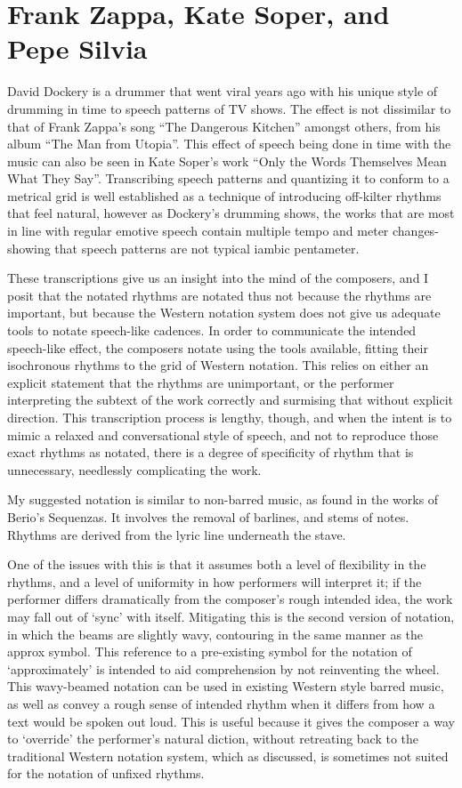 
\section{Frank Zappa, Kate Soper, and Pepe Silvia}
David Dockery is a drummer that went viral years ago with his unique style of drumming in time to speech patterns of TV shows. 
The effect is not dissimilar to that of Frank Zappa's song ``The Dangerous Kitchen'' amongst others, from his album ``The Man from Utopia''. 
This effect of speech being done in time with the music can also be seen in Kate Soper's work ``Only the Words Themselves Mean What They Say''. 
Transcribing speech patterns and quantizing it to conform to a metrical grid is well established as a technique of introducing off-kilter rhythms that feel natural, however as Dockery's drumming shows, the works that are most in line with regular emotive speech contain multiple tempo and meter changes- 
showing that speech patterns are not typical iambic pentameter.

These transcriptions give us an insight into the mind of the composers, and I posit that the notated rhythms are notated thus not because the rhythms are important, but because the Western notation system does not give us adequate tools to notate speech-like cadences. 
In order to communicate the intended speech-like effect, the composers notate using the tools available, fitting their isochronous rhythms to the grid of Western notation.
This relies on either an explicit statement that the rhythms are unimportant, or the performer interpreting the subtext of the work correctly and surmising that without explicit direction.
This transcription process is lengthy, though, and when the intent is to mimic a relaxed and conversational style of speech, and not to reproduce those exact rhythms as notated, there is a degree of specificity of rhythm that is unnecessary, needlessly complicating the work.

My suggested notation is similar to non-barred music, as found in the works of Berio's Sequenzas.
It involves the removal of barlines, and stems of notes. 
Rhythms are derived from the lyric line underneath the stave. 

One of the issues with this is that it assumes both a level of flexibility in the rhythms, and a level of uniformity in how performers will interpret it; if the performer differs dramatically from the composer's rough intended idea, the work may fall out of `sync' with itself.
Mitigating this is the second version of notation, in which the beams are slightly wavy, contouring in the same manner as the \\approx symbol. 
This reference to a pre-existing symbol for the notation of `approximately' is intended to aid comprehension by not reinventing the wheel.
This wavy-beamed notation can be used in existing Western style barred music, as well as convey a rough sense of intended rhythm when it differs from how a text would be spoken out loud.
This is useful because it gives the composer a way to `override' the performer's natural diction, without retreating back to the traditional Western notation system, which as discussed, is sometimes not suited for the notation of unfixed rhythms.

